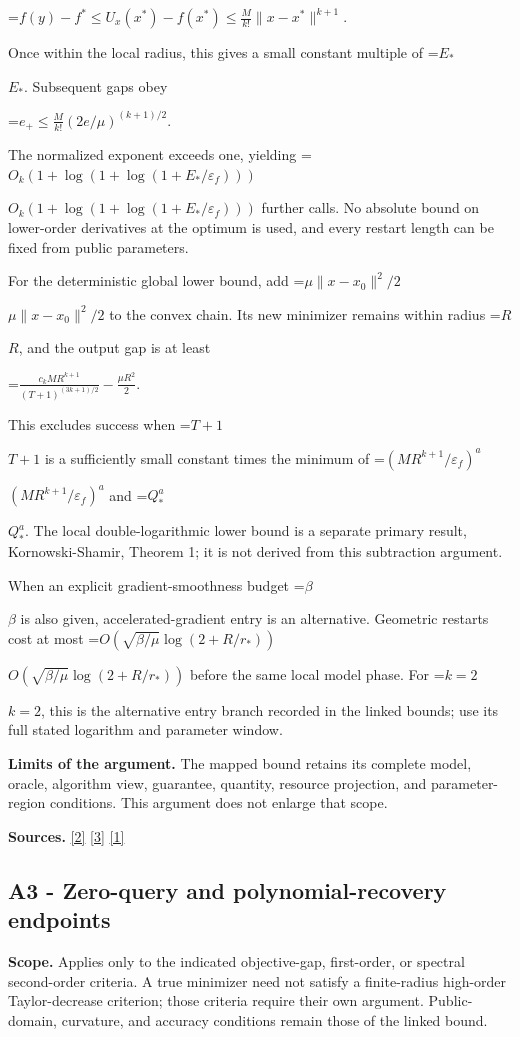 \documentclass[10pt,a4paper]{article}
\newcommand{\AtlasMath}[1]{\par\begingroup\centering\setbox0=\hbox{$\displaystyle #1$}\ifdim\wd0>1.4\linewidth\typeout{ATLAS WIDE FORMULA: \the\wd0}\fi\ifdim\wd0>\linewidth\resizebox{\linewidth}{!}{\box0}\else\box0\fi\par\endgroup}
\newcommand{\AtlasInlineMath}[1]{\begingroup\setbox0=\hbox{$#1$}\ifdim\wd0>.4\linewidth\endgroup\AtlasMath{#1}\else\endgroup$#1$\fi}
\begin{document}
\AtlasMath{f(y)-f^*\le U_x(x^*)-f(x^*)\le\frac M{k!}\|x-x^*\|^{k+1}.}

Once within the local radius, this gives a small constant multiple of \AtlasInlineMath{E_*}. Subsequent gaps obey

\AtlasMath{e_+\le\frac M{k!}(2e/\mu)^{(k+1)/2}.}

The normalized exponent exceeds one, yielding \AtlasInlineMath{O_k(1+\log(1+\log(1+E_*/\varepsilon_f)))} further calls. No absolute bound on lower-order derivatives at the optimum is used, and every restart length can be fixed from public parameters.

For the deterministic global lower bound, add \AtlasInlineMath{\mu\|x-x_0\|^2/2} to the convex chain. Its new minimizer remains within radius \AtlasInlineMath{R}, and the output gap is at least

\AtlasMath{\frac{c_kMR^{k+1}}{(T+1)^{(3k+1)/2}}-\frac{\mu R^2}{2}.}

This excludes success when \AtlasInlineMath{T+1} is a sufficiently small constant times the minimum of \AtlasInlineMath{(MR^{k+1}/\varepsilon_f)^a} and \AtlasInlineMath{Q_*^a}. The local double-logarithmic lower bound is a separate primary result, Kornowski-Shamir, Theorem 1; it is not derived from this subtraction argument.

When an explicit gradient-smoothness budget \AtlasInlineMath{\beta} is also given, accelerated-gradient entry is an alternative. Geometric restarts cost at most \AtlasInlineMath{O(\sqrt{\beta/\mu}\log(2+R/r_*))} before the same local model phase. For \AtlasInlineMath{k=2}, this is the alternative entry branch recorded in the linked bounds; use its full stated logarithm and parameter window.

\textbf{Limits of the argument.} The mapped bound retains its complete model, oracle, algorithm view, guarantee, quantity, resource projection, and parameter-region conditions. This argument does not enlarge that scope.

\textbf{Sources.} \href{https://arxiv.org/pdf/2205.09647v1}{[2]} \href{https://arxiv.org/pdf/2010.06642v2}{[3]} \href{https://arxiv.org/pdf/1705.07260v2}{[1]}

\subsection{A3 - Zero-query and polynomial-recovery endpoints}
\textbf{Scope.} Applies only to the indicated objective-gap, first-order, or spectral second-order criteria. A true minimizer need not satisfy a finite-radius high-order Taylor-decrease criterion; those criteria require their own argument. Public-domain, curvature, and accuracy conditions remain those of the linked bound.
\end{document}
